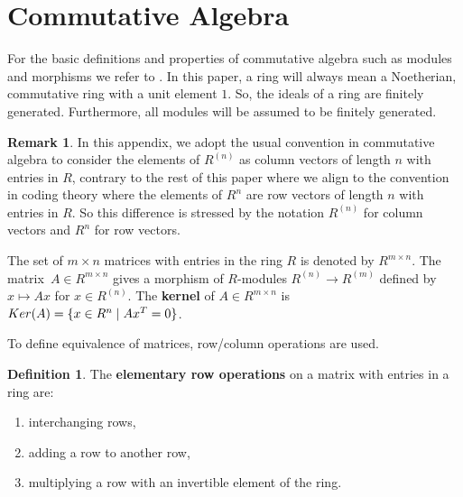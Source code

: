 \documentclass[11pt,a4paper]{article}
\theoremstyle{definition}
\newtheorem{definition}[theorem]{Definition}
\newtheorem{remark}[theorem]{Remark}
\newcommand{\Ker}{\textnormal{Ker}}
\begin{document}
\bigskip




\bigskip

\appendix

\section{Commutative Algebra} \label{commut-alg} 

For the basic definitions and properties of commutative algebra such as modules and morphisms we refer to \cite{atiyah2018introduction,eisenbud1995,lang2012algebra}.
In this paper, a ring will always mean a Noetherian, commutative ring with a unit element $1$. 
So, the ideals of a ring are finitely generated. Furthermore, all modules will be assumed to be finitely generated.

\begin{remark}\label{r-row-column}
In this appendix, we adopt the usual convention in commutative algebra to consider the elements of $R^{(n)}$ as column vectors of length $n$ with entries in $R$,
contrary to the rest of this paper where we align to the convention in coding theory where the elements of $R^n$ are row vectors of length $n$ with entries in $R$.
So this difference is stressed by the notation $R^{(n)}$ for column vectors and $R^n$ for row vectors.

The set of $m \times n$ matrices with entries in the ring $R$ is denoted by $R^{m \times n}$.
The matrix~$A \in R^{m \times n}$ gives a morphism of $R$-modules $R^{(n)} \rightarrow R^{(m)}$ 
defined by $x \mapsto Ax$ for $ x \in R^{(n)}$.
The \textbf{kernel} of $A \in R^{m \times n}$ is $\Ker (A) =\{ x\in R^n \mid Ax^T =0 \}$.
\end{remark}

To define equivalence of matrices, row/column operations are used.


\begin{definition}\label{d-matrix-equiv}
The \textbf{elementary row operations} on a matrix with entries in a ring are:
\begin{enumerate}
    \item interchanging rows,
\item adding a row to another row,
\item multiplying a row with an invertible element of the ring.
\end{enumerate}
\end{definition}
\end{document}
